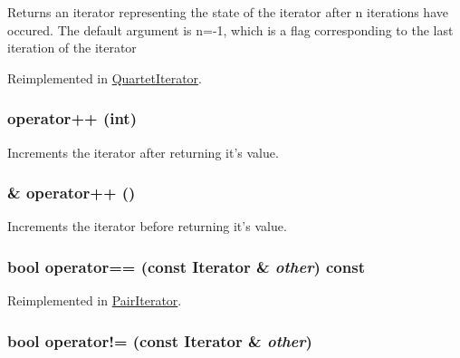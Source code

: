 Returns an iterator representing the state of the iterator after n iterations have occured. The default argument is n=-\/1, which is a flag corresponding to the last iteration of the iterator 

Reimplemented in \hyperlink{classJKBuilder_1_1QuartetIterator_a5f692b73d2e160450f4617bb75825e11}{QuartetIterator}.\hypertarget{classJKBuilder_1_1Iterator_ac1702aedba13b4112b891b58dfd78eba}{
\subsubsection[{operator++}]{ operator++ (int)}}
\label{classJKBuilder_1_1Iterator_ac1702aedba13b4112b891b58dfd78eba}


Increments the iterator after returning it's value. \hypertarget{classJKBuilder_1_1Iterator_ae1f21c74128a5ef5d1b9de72ceb09be8}{
\subsubsection[{operator++}]{ \& operator++ ()}}
\label{classJKBuilder_1_1Iterator_ae1f21c74128a5ef5d1b9de72ceb09be8}


Increments the iterator before returning it's value. \hypertarget{classJKBuilder_1_1Iterator_a1ea001976a5bc8ae8dc365e2a912b59a}{
\subsubsection[{operator==}]{\setlength{\rightskip}{0pt plus 5cm}bool operator== (const {\bf Iterator} \& {\em other}) const}}
\label{classJKBuilder_1_1Iterator_a1ea001976a5bc8ae8dc365e2a912b59a}


Reimplemented in \hyperlink{classJKBuilder_1_1PairIterator_a6b4e430066f478e5e400edd39ef93968}{PairIterator}.\hypertarget{classJKBuilder_1_1Iterator_a8c06af8ae0d9d1614ae9f81629275926}{
\subsubsection[{operator!=}]{\setlength{\rightskip}{0pt plus 5cm}bool operator!= (const {\bf Iterator} \& {\em other})}}
\label{classJKBuilder_1_1Iterator_a8c06af8ae0d9d1614ae9f81629275926}


